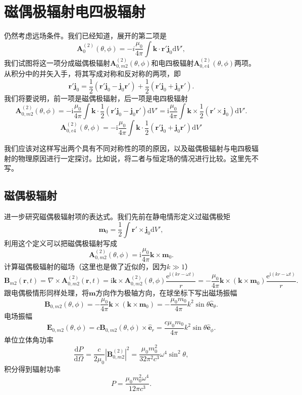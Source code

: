 \documentclass[UTF8]{ctexbook}
\newcommand{\e}{\mathrm{e}}
\renewcommand{\d}{\mathrm{d}}
\renewcommand{\b}{\boldsymbol}
\renewcommand{\i}{\mathrm{i}}
\numberwithin{equation}{chapter}
\begin{document}
	\section{磁偶极辐射\quad 电四极辐射}
	仍然考虑远场条件。我们已经知道，展开的第二项是
	\[\b{A}_0^{(2)}(\theta,\phi)=-i\frac{\mu_0}{4\pi}\int\b{k}\cdot\b{r}'\b{j}_0\d V',\]
	我们试图将这一项分成磁偶极辐射$\b{A}_{0,m2}^{(2)}(\theta,\phi)$和电四极辐射$\b{A}_{0,e4}^{(2)}(\theta,\phi)$两项。从积分中的并矢入手，将其写成对称和反对称的两项，即
	\[\b{r}'\b{j}_0=\frac{1}{2}(\b{r}'\b{j}_0-\b{j}_0\b{r'})+\frac{1}{2}(\b{r}'\b{j}_0+\b{j}_0\b{r}').\]
	我们将要说明，前一项是磁偶极辐射，后一项是电四极辐射
	\[\b{A}_{0,m2}^{(2)}(\theta,\phi)=-\i\frac{\mu_0}{4\pi}\int\b{k}\cdot\frac{1}{2}(\b{r}'\b{j}_0-\b{j}_0\b{r}')\d V'=\i\frac{\mu_0}{4\pi}\int\b{k}\times\frac{1}{2}(\b{r}'\times\b{j}_0)\d V'.\]
	\[\b{A}_{0,e4}^{(2)}(\theta,\phi)=-\i\frac{\mu_0}{4\pi}\int\b{k}\cdot\frac{1}{2}(\b{r}'\b{j}_0+\b{j}_0\b{r}')\d V'\]
	
	我们应该对这样写出两个具有不同对称性的项的原因，以及磁偶极辐射与电四极辐射的物理原因进行一定探讨。比如说，将二者与恒定场的情况进行比较。这里先不写。
	
	\subsection{磁偶极辐射}
	进一步研究磁偶极辐射项的表达式。我们先前在静电情形定义过磁偶极矩
	\[\b{m}_0=\frac{1}{2}\int\b{r}'\times\b{j}_0\d V',\]
	利用这个定义可以把磁偶极辐射写成
	\[\b{A}_{0,m2}^{(2)}(\theta,\phi)=\i\frac{\mu_0}{4\pi}\b{k}\times\b{m}_0.\]
	计算磁偶极辐射的磁场（这里也是做了近似的，因为$k\gg 1$）
	\[\b{B}_{m2}(\b{r},t)=\nabla\times\b{A}_{0,m2}^{(2)}(\b{r},t)=\i\b{k}\times\b{A}_{0,m2}^{(2)}(\theta,\phi)\frac{\e^{\i(kr-\omega t)}}{r}=-\frac{\mu_0}{4\pi}\b{k}\times(\b{k}\times\b{m}_0)\frac{\e^{\i(kr-\omega t)}}{r}.\]
	跟电偶极情形同样处理，将$\b{m}$方向作为极轴方向，在球坐标下写出磁场振幅
	\[\b{B}_{0,m2}(\theta,\phi)=-\frac{\mu_0}{4\pi}\b{k}\times(\b{k}\times\b{m}_0)=-\frac{\mu_0m_0}{4\pi}k^2\sin\theta\hat{\b{e}}_\theta.\]
	电场振幅
	\[\b{E}_{0,m2}(\theta,\phi)=c\b{B}_{0,m2}(\theta,\phi)\times\hat{\b{e}}_r=\frac{c\mu_0m_0}{4\pi}k^2\sin\theta\hat{\b{e}}_\phi.\]
	单位立体角功率
	\[\frac{\d P}{\d \Omega}=\frac{c}{2\mu_0}|\b{B}_{0,m2}^{(2)}|^2=\frac{\mu_0m_0^2}{32\pi^2c^3}\omega^4\sin^2\theta,\]
	积分得到辐射功率
	\[P=\frac{\mu_0m_0^2\omega^4}{12\pi c^3}.\]
	
\end{document}
